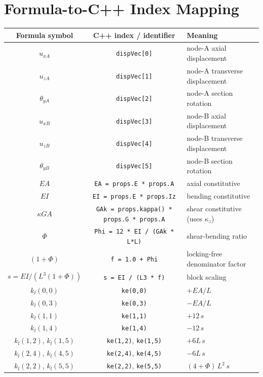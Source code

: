 \documentclass[11pt,a4paper]{article}
\begin{document}
\section{Formula-to-C++ Index Mapping}\label{sec:indexmap}

\begin{longtable}{c c l}
\toprule
Formula symbol & C++ index / identifier & Meaning \\
\midrule \endhead
$u_{xA}$              & \texttt{dispVec[0]}    & node-A axial displacement \\
$u_{zA}$              & \texttt{dispVec[1]}    & node-A transverse displacement \\
$\theta_{yA}$         & \texttt{dispVec[2]}    & node-A section rotation \\
$u_{xB}$              & \texttt{dispVec[3]}    & node-B axial displacement \\
$u_{zB}$              & \texttt{dispVec[4]}    & node-B transverse displacement \\
$\theta_{yB}$         & \texttt{dispVec[5]}    & node-B section rotation \\
\midrule
$EA$                  & \texttt{EA = props.E * props.A} & axial constitutive \\
$EI$                  & \texttt{EI = props.E * props.Iz} & bending constitutive \\
$\kappa GA$           & \texttt{GAk = props.kappa() * props.G * props.A} & shear constitutive (uses $\kappa_z$) \\
$\Phi$                & \texttt{Phi = 12 * EI / (GAk * L*L)} & shear-bending ratio \\
$(1 + \Phi)$          & \texttt{f = 1.0 + Phi} & locking-free denominator factor \\
$s = EI / (L^3 (1+\Phi))$ & \texttt{s = EI / (L3 * f)} & block scaling \\
\midrule
$k_l(0,0)$            & \texttt{ke(0,0)} & $+EA/L$ \\
$k_l(0,3)$            & \texttt{ke(0,3)} & $-EA/L$ \\
$k_l(1,1)$            & \texttt{ke(1,1)} & $+12\,s$ \\
$k_l(1,4)$            & \texttt{ke(1,4)} & $-12\,s$ \\
$k_l(1,2)$, $k_l(1,5)$ & \texttt{ke(1,2)}, \texttt{ke(1,5)} & $+6L\,s$ \\
$k_l(2,4)$, $k_l(4,5)$ & \texttt{ke(2,4)}, \texttt{ke(4,5)} & $-6L\,s$ \\
$k_l(2,2)$, $k_l(5,5)$ & \texttt{ke(2,2)}, \texttt{ke(5,5)} & $(4+\Phi)\,L^2\,s$ \\

\end{longtable}
\end{document}
